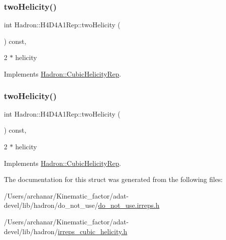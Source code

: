 \subsubsection{\texorpdfstring{twoHelicity()}{twoHelicity()}\hspace{0.1cm}{\footnotesize\ttfamily [2/3]}}
{\footnotesize\ttfamily int Hadron\+::\+H4\+D4\+A1\+Rep\+::two\+Helicity (\begin{DoxyParamCaption}{ }\end{DoxyParamCaption}) const\hspace{0.3cm}{\ttfamily [inline]}, {\ttfamily [virtual]}}

2 $\ast$ helicity 

Implements \mbox{\hyperlink{structHadron_1_1CubicHelicityRep_af507aa56fc2747eacc8cb6c96db31ecc}{Hadron\+::\+Cubic\+Helicity\+Rep}}.

\mbox{\label{structHadron_1_1H4D4A1Rep_a67669ae49658ab0d57fd52e138c9dd40}} 
\subsubsection{\texorpdfstring{twoHelicity()}{twoHelicity()}\hspace{0.1cm}{\footnotesize\ttfamily [3/3]}}
{\footnotesize\ttfamily int Hadron\+::\+H4\+D4\+A1\+Rep\+::two\+Helicity (\begin{DoxyParamCaption}{ }\end{DoxyParamCaption}) const\hspace{0.3cm}{\ttfamily [inline]}, {\ttfamily [virtual]}}

2 $\ast$ helicity 

Implements \mbox{\hyperlink{structHadron_1_1CubicHelicityRep_af507aa56fc2747eacc8cb6c96db31ecc}{Hadron\+::\+Cubic\+Helicity\+Rep}}.



The documentation for this struct was generated from the following files\+:\begin{DoxyCompactItemize}
\item 
/\+Users/archanar/\+Kinematic\+\_\+factor/adat-\/devel/lib/hadron/do\+\_\+not\+\_\+use/\mbox{\hyperlink{adat-devel_2lib_2hadron_2do__not__use_2do__not__use_8irreps_8h}{do\+\_\+not\+\_\+use.\+irreps.\+h}}\item 
/\+Users/archanar/\+Kinematic\+\_\+factor/adat-\/devel/lib/hadron/\mbox{\hyperlink{adat-devel_2lib_2hadron_2irreps__cubic__helicity_8h}{irreps\+\_\+cubic\+\_\+helicity.\+h}}\end{DoxyCompactItemize}

